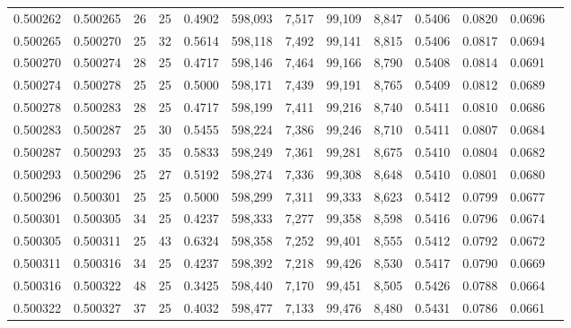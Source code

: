 \begin{tabular}{rrrrrrrrrrrrr}
0.500262 & 0.500265 &    26 &  25 &                                     0.4902 & 598,093 &   7,517 &  99,109 &   8,847 & 0.5406 & 0.0820 & 0.0696 \\
0.500265 & 0.500270 &    25 &  32 &                                     0.5614 & 598,118 &   7,492 &  99,141 &   8,815 & 0.5406 & 0.0817 & 0.0694 \\
0.500270 & 0.500274 &    28 &  25 &                                     0.4717 & 598,146 &   7,464 &  99,166 &   8,790 & 0.5408 & 0.0814 & 0.0691 \\
0.500274 & 0.500278 &    25 &  25 &                                     0.5000 & 598,171 &   7,439 &  99,191 &   8,765 & 0.5409 & 0.0812 & 0.0689 \\
0.500278 & 0.500283 &    28 &  25 &                                     0.4717 & 598,199 &   7,411 &  99,216 &   8,740 & 0.5411 & 0.0810 & 0.0686 \\
0.500283 & 0.500287 &    25 &  30 &                                     0.5455 & 598,224 &   7,386 &  99,246 &   8,710 & 0.5411 & 0.0807 & 0.0684 \\
0.500287 & 0.500293 &    25 &  35 &                                     0.5833 & 598,249 &   7,361 &  99,281 &   8,675 & 0.5410 & 0.0804 & 0.0682 \\
0.500293 & 0.500296 &    25 &  27 &                                     0.5192 & 598,274 &   7,336 &  99,308 &   8,648 & 0.5410 & 0.0801 & 0.0680 \\
0.500296 & 0.500301 &    25 &  25 &                                     0.5000 & 598,299 &   7,311 &  99,333 &   8,623 & 0.5412 & 0.0799 & 0.0677 \\
0.500301 & 0.500305 &    34 &  25 &                                     0.4237 & 598,333 &   7,277 &  99,358 &   8,598 & 0.5416 & 0.0796 & 0.0674 \\
0.500305 & 0.500311 &    25 &  43 &                                     0.6324 & 598,358 &   7,252 &  99,401 &   8,555 & 0.5412 & 0.0792 & 0.0672 \\
0.500311 & 0.500316 &    34 &  25 &                                     0.4237 & 598,392 &   7,218 &  99,426 &   8,530 & 0.5417 & 0.0790 & 0.0669 \\
0.500316 & 0.500322 &    48 &  25 &                                     0.3425 & 598,440 &   7,170 &  99,451 &   8,505 & 0.5426 & 0.0788 & 0.0664 \\
0.500322 & 0.500327 &    37 &  25 &                                     0.4032 & 598,477 &   7,133 &  99,476 &   8,480 & 0.5431 & 0.0786 & 0.0661 \\

\end{tabular}
